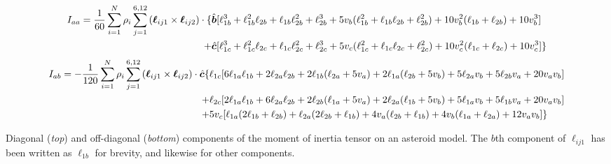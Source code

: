 \documentclass[aps,twocolumn,secnumarabic,balancelastpage,amsmath,amssymb,nofootinbib,floatfix]{revtex4-1}
\begin{document}
\begin{table*}
    \begin{equation}
        \begin{aligned}
            I_{aa} = \frac{1}{60}\sum_{i=1}^N \rho_i \sum_{j=1}^{6, 12} \left( \bm \ell_{ij1}\times \bm \ell_{ij2} \right)\cdot \{&\hat{\bm b}[\ell_{1b}^3 + \ell_{1b}^2 \ell_{2b} + \ell_{1b} \ell_{2b}^2 + \ell_{2b}^3 +
            5 v_b (\ell_{1b}^2 + \ell_{1b} \ell_{2b} + \ell_{2b}^2) +
            10 v_b^2 (\ell_{1b} + \ell_{2b}) + 10 v_b^3]\\
             + & \hat {\bm c}[\ell_{1c}^3 + \ell_{1c}^2 \ell_{2c} + \ell_{1c} \ell_{2c}^2 + \ell_{2c}^3 + 5 v_c (\ell_{1c}^2 + \ell_{1c} \ell_{2c} + \ell_{2c}^2) + 10 v_c^2(\ell_{1c} + \ell_{2c}) + 10 v_c^3]\}
        \end{aligned}
    \label{eqn:analytical-moi-same}
    \end{equation}
    \begin{equation}
        \begin{aligned}
            I_{ab} = -\frac{1}{120}\sum_{i=1}^N \rho_i \sum_{j=1}^{6, 12} \left( \bm \ell_{ij1}\times \bm \ell_{ij2} \right)\cdot \hat{\bm c}\{
                &\ell_{1c} [6 \ell_{1a} \ell_{1b} + 2 \ell_{2a} \ell_{2b} + 2 \ell_{1b} (\ell_{2a} + 5 v_a) + 2 \ell_{1a} (\ell_{2b} + 5 v_b) +  5 \ell_{2a} v_b + 5 \ell_{2b} v_a + 20 v_a v_b] \\
                + &\ell_{2c}[2 \ell_{1a} \ell_{1b} + 6 \ell_{2a} \ell_{2b}
                + 2 \ell_{2b}(\ell_{1a}  + 5 v_a) + 2 \ell_{2a}(\ell_{1b} + 5 v_b)
                + 5 \ell_{1a} v_b + 5 \ell_{1b}v_a + 20 v_a v_b] \\
                + &5v_c[ \ell_{1a} (2\ell_{1b} + \ell_{2b}) + \ell_{2a}(2\ell_{2b} + \ell_{1b}) + 4 v_a(\ell_{2b} + \ell_{1b}) + 4v_b(\ell_{1a} + \ell_{2a})  + 12 v_a v_b]\}
        \end{aligned}
    \label{eqn:analytical-moi-diff}
    \end{equation}
    \caption*{Diagonal (\textit{top}) and off-diagonal (\textit{bottom}) components of the moment of inertia tensor on an asteroid model. The $b$th component of $\bm \ell_{ij1}$ has been written as $\ell_{1b}$ for brevity, and likewise for other components.}
\end{table*}
\end{document}
